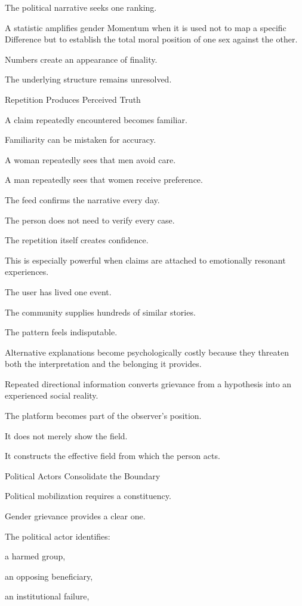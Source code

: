 The political narrative seeks one ranking.

A statistic amplifies gender Momentum when it is used not to map a specific Difference but to establish the total moral position of one sex against the other.

Numbers create an appearance of finality.

The underlying structure remains unresolved.

Repetition Produces Perceived Truth

A claim repeatedly encountered becomes familiar.

Familiarity can be mistaken for accuracy.

A woman repeatedly sees that men avoid care.

A man repeatedly sees that women receive preference.

The feed confirms the narrative every day.

The person does not need to verify every case.

The repetition itself creates confidence.

This is especially powerful when claims are attached to emotionally resonant experiences.

The user has lived one event.

The community supplies hundreds of similar stories.

The pattern feels indisputable.

Alternative explanations become psychologically costly because they threaten both the interpretation and the belonging it provides.

Repeated directional information converts grievance from a hypothesis into an experienced social reality.

The platform becomes part of the observer’s position.

It does not merely show the field.

It constructs the effective field from which the person acts.

Political Actors Consolidate the Boundary

Political mobilization requires a constituency.

Gender grievance provides a clear one.

The political actor identifies:

a harmed group,

an opposing beneficiary,

an institutional failure,


